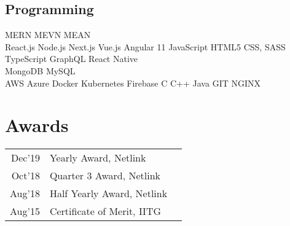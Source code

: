\documentclass[]{ayush-gupta-resume-openfont}
\begin{document}
\begin{minipage}[t]{0.28\textwidth}
\subsection{Programming}
\vspace{2mm}
MERN \textbullet{} MEVN \textbullet{} MEAN \\
\vspace{2mm}
React.js \textbullet{}   Node.js \textbullet{} Next.js \textbullet{} Vue.js \textbullet{} Angular 11 \textbullet{} JavaScript \textbullet{} HTML5 \textbullet{} CSS, SASS \\
\vspace{2mm}
TypeScript \textbullet{} GraphQL \textbullet{} React Native \textbullet{} \\
\vspace{2mm}
MongoDB \textbullet{} MySQL \\
\vspace{2mm}
AWS \textbullet{} Azure \textbullet{}Docker \textbullet{} Kubernetes \textbullet{} Firebase \textbullet{} C \textbullet{} C++ \textbullet{} Java \textbullet{} GIT \textbullet{} NGINX
\sectionsep


\section{Awards} 
\begin{tabular}{rll}
Dec'19  & Yearly Award, Netlink\\
Oct'18  & Quarter 3 Award, Netlink\\
Aug'18  & Half Yearly Award, Netlink\\
Aug'15  & Certificate of Merit, IITG \\
\end{tabular}
\sectionsep

%
%

\end{minipage} 
\hfill
\end{document}
